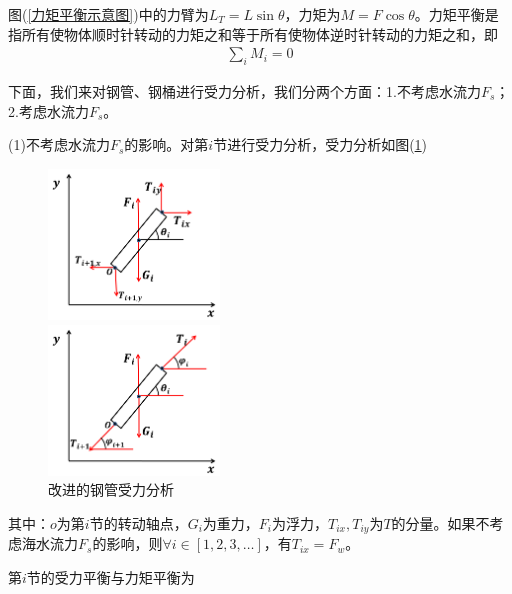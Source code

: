 \documentclass[UTF8]{ctexbook}
\theoremstyle{nonumberplain}
\begin{document}
            图(\ref{力矩平衡示意图})中的力臂为$L_T = L\sin \theta$，力矩为$M = F\cos\theta$。力矩平衡是指所有使物体顺时针转动的力矩之和等于所有使物体逆时针转动的力矩之和，即
            \begin{align*}
            \sum_i M_i = 0
            \end{align*}
            \par
            下面，我们来对钢管、钢桶进行受力分析，我们分两个方面：1.不考虑水流力$F_s$；2.考虑水流力$F_s$。
            \par
            (1)不考虑水流力$F_s$的影响。对第$i$节进行受力分析，受力分析如图(\ref{改进的钢管受力分析})
            \begin{figure}[H]
              \centering
              \begin{varwidth}[t]{\textwidth}
                \vspace{0pt}
                \includegraphics[height=4cm]{images/Improved_chart1.jpg}
              \end{varwidth}
              \qquad
              \begin{varwidth}[t]{\textwidth}
                \vspace{0pt}
                \includegraphics[height=4cm]{images/Improved_chart2.jpg}
              \end{varwidth}
            \caption{改进的钢管受力分析}
            \label{改进的钢管受力分析}
            \end{figure}
            其中：$o$为第$i$节的转动轴点，$G_i$为重力，$F_i$为浮力，$T_{ix},T_{iy}$为$T$的分量。如果不考虑海水流力$F_s$的影响，则$\forall i\in [1,2,3,\dots]$，有$T_{ix} = F_w$。
            \par
            第$i$节的受力平衡与力矩平衡为
\end{document}

